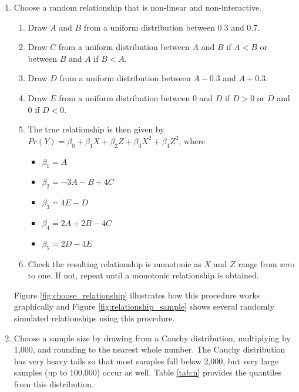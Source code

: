 \documentclass[12pt]{article}
\begin{document}
\begin{appendix}
\begin{enumerate}
\item Choose a random relationship that is non-linear and non-interactive.
        \begin{enumerate}
        \item Draw $A$ and $B$ from a uniform distribution between 0.3 and 0.7.
        \item Draw $C$ from a uniform distribution between $A$ and $B$ if $A < B$ or between $B$ and $A$ if $B < A$.
        \item Draw $D$ from a uniform distribution between $A - 0.3$ and $A + 0.3$.
        \item Draw $E$ from a uniform distribution between 0 and $D$ if $D > 0$ or $D$ and 0 if $D < 0$.
        \item The true relationship is then given by $Pr(Y) = \beta_0 + \beta_1X + \beta_2Z + \beta_3X^2 + \beta_4Z^2$, where
                \begin{itemize}
                \item $\beta_1 = A$
                \item $\beta_2 = -3A - B + 4C$ 
                \item $\beta_3 = 4E - D$
                \item $\beta_4 = 2A + 2B - 4C$
                \item $\beta_5 = 2D - 4E$ 
                \end{itemize}
        \item Check the resulting relationship is monotonic as $X$ and $Z$ range from zero to one. If not, repeat until a monotonic relationship is obtained.
        \end{enumerate}
        Figure \ref{fig:choose_relationship} illustrates how this procedure works graphically and Figure    \ref{fig:relationship_sample} shows several randomly simulated relationships using this procedure.



        \item Choose a sample size by drawing from a Cauchy distribution, multiplying by 1,000, and rounding to the nearest whole number. The Cauchy distribution has very heavy tails so that most samples fall below 2,000, but very large samples (up to 100,000) occur as well. Table \ref{tab:n} provides the quantiles from this distribution.
        

\end{enumerate}
\end{appendix}
\end{document}
